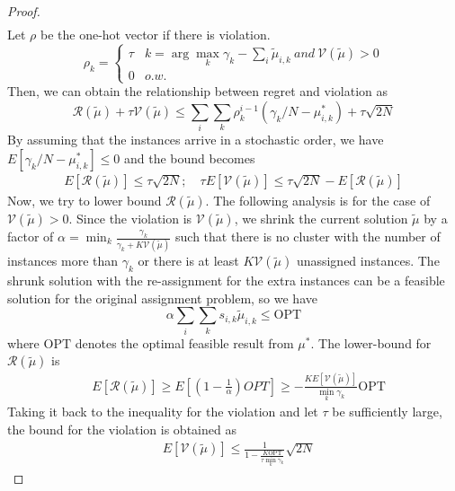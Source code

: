 \documentclass[10pt,twocolumn,letterpaper]{article}
\def \R {\mathcal{R}}
\def \V {\mathcal{V}}
\begin{document}
\begin{proof}
\begin{eqnarray*}
\end{eqnarray*}
Let $\rho$ be the one-hot vector if there is violation.
\[\rho_k = \left\{\begin{array}{cc}\tau&k = \arg\max_k \gamma_k-\sum_i \tilde{\mu}_{i,k}\ and\ \V(\tilde{\mu})>0\\0&o.w.\end{array}\right.\]
Then, we can obtain the relationship between regret and violation as
\[\R(\tilde{\mu}) +\tau\V(\tilde{\mu})\leq \sum_i \sum_k\rho_k^{i-1}(\gamma_k/N-\mu_{i,k}^*)+\tau\sqrt{2N}\]
By assuming that the instances arrive in a stochastic order, we have $E[\gamma_k/N-\mu_{i,k}^*]\leq 0$ and the bound becomes
\begin{align*}
E[\R(\tilde{\mu})] \leq \tau\sqrt{2N};\quad \tau E[\V(\tilde{\mu})]\leq \tau \sqrt{2N} - E[\R(\tilde{\mu})]
\end{align*}
Now, we try to lower bound $\R(\tilde{\mu})$. The following analysis is for the case of $\V(\tilde{\mu})>0$. Since the violation is $\V(\tilde{\mu})$, we shrink the current solution $\tilde{\mu}$ by a factor of $\alpha=\min_k\frac{\gamma_k}{\gamma_k+K\V(\tilde{\mu})}$ such that there is no cluster with the number of instances more than $\gamma_k$ or there is at least $K\V(\tilde{\mu})$ unassigned instances. The shrunk solution with the re-assignment for the extra instances can be a feasible solution for the original assignment problem, so we have
\[\alpha \sum_i\sum_k s_{i,k} \tilde{\mu}_{i,k} \leq \mathrm{OPT}\]
where $\mathrm{OPT}$ denotes the optimal feasible result from $\mu^*$.
The lower-bound for $\R(\tilde{\mu})$ is
\begin{align*}
&E[\R(\tilde{\mu})]\geq E[(1-\frac{1}{\alpha})OPT]\geq -\frac{KE[\V(\tilde{\mu})]}{\min_k \gamma_k}\mathrm{OPT}
\end{align*}
Taking it back to the inequality for the violation and let $\tau$ be sufficiently large, the bound for the violation is obtained as
\begin{align*}
&E[\V(\tilde{\mu})] \leq \frac{1}{1 - \frac{K\mathrm{OPT}}{\tau\min_k \gamma_k}}  \sqrt{2N}
\end{align*}
\end{proof}
\end{document}
